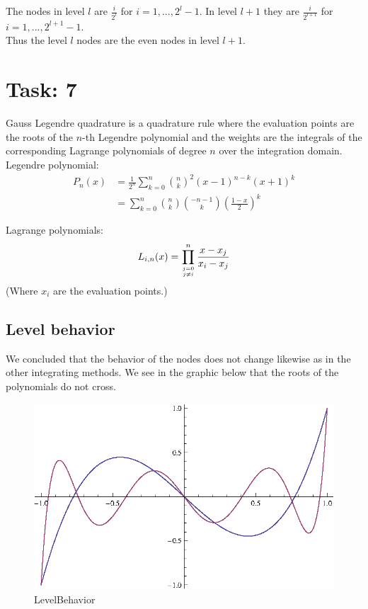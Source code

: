 \documentclass{article}
\begin{document}
The nodes in level $l$ are $\frac{i}{2^l}$ for $i=1,...,2^l-1$.
In level $l + 1$ they are $\frac{i}{2^{l+1}}$ for $i=1,...,2^{l+1}-1$.\\
Thus the level $l$ nodes are the even nodes in level $l+1$.

\section*{Task: 7}

\noindent Gauss Legendre quadrature is a quadrature rule where the evaluation points are the roots of the
$n$-th Legendre polynomial and the weights are the integrals of the corresponding Lagrange polynomials of degree $n$ over the integration domain.\\

\noindent Legendre polynomial:
\begin{align*}
 P_n(x)&=\frac{1}{2^n}\sum_{k=0}^n {n \choose k}^2 (x-1)^{n-k}(x+1)^k \\
 &= \sum_{k=0}^n {n \choose k}{-n-1 \choose k}\left(\frac{1-x}{2}\right)^k
\end{align*}

\noindent Lagrange polynomials:
\begin{align*}
 L_{i,n}(x)=\prod_{j=0 \atop j\neq i}^n \frac{x-x_j}{x_i-x_j}
\end{align*}
(Where $x_i$ are the evaluation points.)

\subsection*{Level behavior}
We concluded that the behavior of the nodes does not change likewise as in the other integrating methods. We see in the graphic below that the roots of the polynomials do not cross.
\begin{figure}[htbp]
  \centering
     \includegraphics[width=1.00\textwidth]{../Task07/LevelBehavior.eps}
   \caption{LevelBehavior}
\end{figure}
\end{document}

